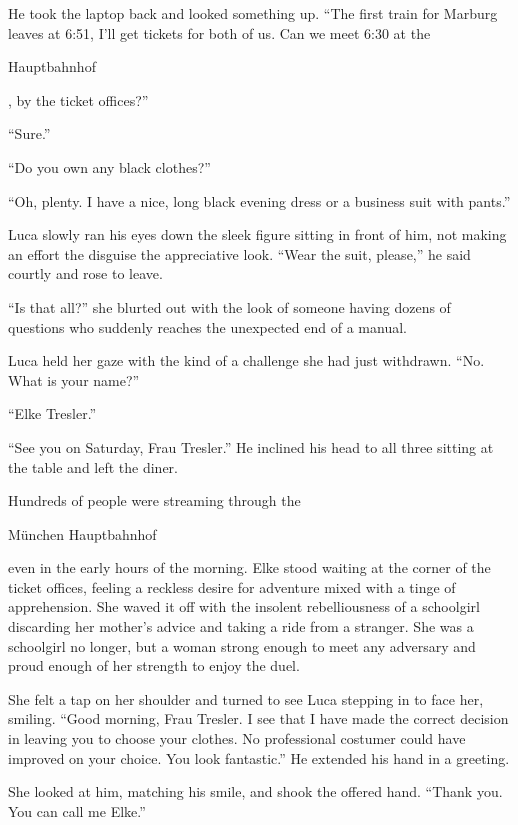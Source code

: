 He took the laptop back and looked something up. ``The first train for Marburg leaves at 6:51, I'll get tickets for both of us. Can we meet 6:30 at the \begin{otherlanguage}{ngerman}Hauptbahnhof\end{otherlanguage}, by the ticket offices?''

``Sure.''

``Do you own any black clothes?''

``Oh, plenty. I have a nice, long black evening dress or a business suit with pants.''

Luca slowly ran his eyes down the sleek figure sitting in front of him, not making an effort the disguise the appreciative look. ``Wear the suit, please,'' he said courtly and rose to leave.

``Is that all?'' she blurted out with the look of someone having dozens of questions who suddenly reaches the unexpected end of a manual.

Luca held her gaze with the kind of a challenge she had just withdrawn. ``No. What is your name?''

``Elke Tresler.''

``See you on Saturday, Frau Tresler.'' He inclined his head to all three sitting at the table and left the diner.

\sectionline

Hundreds of people were streaming through the \begin{otherlanguage}{ngerman}München Hauptbahnhof\end{otherlanguage}{} even in the early hours of the morning. Elke stood waiting at the corner of the ticket offices, feeling a reckless desire for adventure mixed with a tinge of apprehension. She waved it off with the insolent rebelliousness of a schoolgirl discarding her mother's advice and taking a ride from a stranger. She was a schoolgirl no longer, but a woman strong enough to meet any adversary and proud enough of her strength to enjoy the duel.

She felt a tap on her shoulder and turned to see Luca stepping in to face her, smiling. ``Good morning, Frau Tresler. I see that I have made the correct decision in leaving you to choose your clothes. No professional costumer could have improved on your choice. You look fantastic.'' He extended his hand in a greeting.

She looked at him, matching his smile, and shook the offered hand. ``Thank you. You can call me Elke.''

